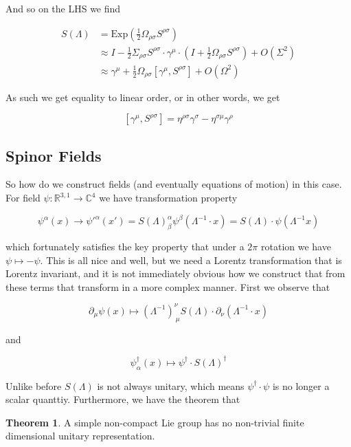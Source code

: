 \documentclass{article}
\theoremstyle{definition}
\newtheorem{theorem}{Theorem}
\begin{document}
And so on the LHS we find

\begin{align*}
  S(\Lambda) &= \text{Exp} \left( \frac{1}{2} \Omega_{\rho \sigma}
               S^{\rho \sigma} \right) \\
             &\approx I - \frac{1}{2} \Sigma_{\rho \sigma} S^{\rho \sigma}
               \cdot \gamma^\mu \cdot \left( I + \frac{1}{2} \Omega_{\rho \sigma}
               S^{\rho \sigma} \right) + O(\Sigma^2) \\
             &\approx \gamma^\mu + \frac{1}{2} \Omega_{\rho \sigma}
               [\gamma^\mu, S^{\rho \sigma}] + O(\Omega^2)
\end{align*}

As such we get equality to linear order, or in other words, we get

$$ [\gamma^\mu, S^{\rho \sigma}] = \eta^{\rho \sigma} \gamma^\sigma -
\eta^{\sigma \mu} \gamma^\rho $$

\subsection{Spinor Fields}

So how do we construct fields (and eventually equations of motion) in this case.
For field $\psi : \mathbb{R}^{3, 1} \to \mathbb{C}^4$ we have transformation
property

$$ \psi^\alpha(x) \to \psi'^\alpha(x') = S(\Lambda)^\alpha_\beta
\psi^\beta(\Lambda^{-1} \cdot x) = S(\Lambda) \cdot \psi(\Lambda^{-1} x) $$

which fortunately satisfies the key property that under a $2\pi$ rotation we
have $\psi \mapsto -\psi$. This is all nice and well, but we need a Lorentz
transformation that is Lorentz invariant, and it is not immediately obvious how
we construct that from these terms that transform in a more complex manner.
First we observe that

$$ \partial_\mu \psi(x) \mapsto (\Lambda^{-1})^\nu_{\ \mu} S(\Lambda) \cdot
\partial_\nu (\Lambda^{-1} \cdot x) $$

and 

$$ \psi^\dagger_\alpha(x) \mapsto \psi^\dagger \cdot S(\Lambda)^\dagger $$

Unlike before $S(\Lambda)$ is not always unitary, which means $\psi^\dagger
\cdot \psi$ is no longer a scalar quanttiy. Furthermore, we have the theorem
that

\begin{theorem}
A simple non-compact Lie group has no non-trivial finite dimensional unitary
representation.
\end{theorem}
\end{document}
